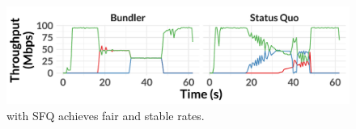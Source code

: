 \begin{figure}
    \centering
\begin{knitrout}
\color{fgcolor}
\includegraphics[width=\maxwidth]{figure/eval:waterfall-1} 

\end{knitrout}
    \caption{\name with SFQ achieves fair and stable rates.}
    \label{fig:eval:waterfall}
\end{figure}
